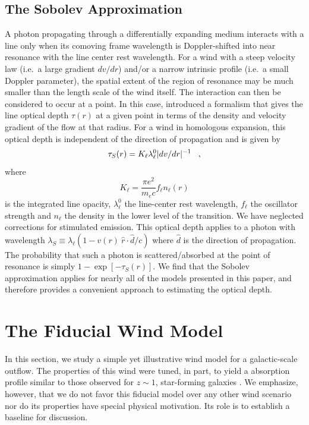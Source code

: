 \documentclass[]{emulateapj}
\begin{document}
\subsection{The Sobolev Approximation}

A photon propagating through a differentially expanding medium
interacts with a line only when
its comoving frame wavelength is Doppler-shifted into near resonance with the line center rest wavelength. 
For a wind with a steep velocity law  (i.e.\ a large gradient $dv/dr$)
and/or a narrow intrinsic profile (i.e.\ a small Doppler parameter), the 
spatial extent of the region of resonance
may be much smaller than the length scale of the
wind itself.  The interaction can then 
be considered to occur at  a point.
In this case, \citet{sobolev60} introduced a formalism that gives the line optical depth $\tau(r)$ at  
a given point in terms of the density and
velocity gradient of the flow at that radius.  For a wind in homologous expansion,
this optical depth is independent of the direction of propagation and
is given by
\begin{equation}
\tau_S(r) = K_\ell   \lambda^0_\ell | dv/dr |^{-1} \;\;\; ,
\label{eqn:Sobolev}
\end{equation}
where 
\begin{equation}
K_\ell = \frac{\pi e^2}{m_e c} f_\ell n_\ell(r)
\end{equation}
is the integrated line opacity, $\lambda^0_\ell$ the line-center rest wavelength,
$f_\ell$ the oscillator strength and
$n_\ell$ the density in the lower level of the transition.   We have
neglected corrections for stimulated emission.   This optical
depth applies to a photon with wavelength $\lambda_S
\equiv \lambda_\ell (1- v(r)~\hat{r}  \cdot \hat{d} /c)$ where $\hat{d}$ is the 
direction of propagation.  The probability that such a photon
is scattered/absorbed at the point of resonance is simply $1 - \exp[-\tau_S(r)]$.
We find that the Sobolev approximation applies for nearly all of the
models presented in this paper, and therefore provides a convenient
approach to estimating the optical depth.



\section{The Fiducial Wind Model}
\label{sec:fiducial}

In this section, we study a simple yet illustrative wind model for
a galactic-scale outflow.  The properties of this wind were tuned, in
part, to yield a  absorption profile 
similar to those observed for $z \sim 1$, star-forming galaxies
\citep{wcp+09,rubin+10c}.  We emphasize, however, that we do not
favor this fiducial model over any other wind scenario nor do its
properties have special physical motivation.
Its role is to establish a baseline
for discussion.
\end{document}
